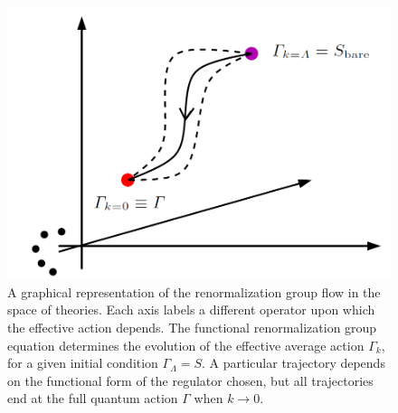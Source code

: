\begin{figure}
\begin{center}
\includegraphics[scale=0.3]{Immagini/azionerunning.png}
\caption{A graphical representation of the renormalization group flow in the space of theories.  Each axis labels a different operator upon which the effective action depends. The functional renormalization group equation determines the evolution of the effective average action $\Gamma_k$, for a given initial condition $\Gamma_\Lambda = S$. A particular trajectory depends on the functional form of the regulator chosen, but all trajectories end at the full quantum action $\Gamma$ when $k\to0$.}
\label{fig:gammaflusso}
\end{center}
\end{figure}



